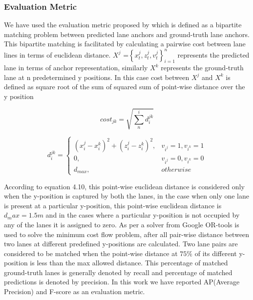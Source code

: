             \subsubsection{Evaluation Metric}
            
            We have used the evaluation metric proposed by \cite{guo2020gen} which is defined as a bipartite matching problem between predicted lane anchors and ground-truth lane anchors. This bipartite matching is facilitated by calculating a pairwise cost between lane lines in terms of euclidean distance. $X^{j}$ =$ \left\{x^{j}_{t},z^{j}_{t},v^{j}_{t}\right\}_{i=1}^{n}     $ represents the predicted lane in terms of anchor representation, similarly $X^{k}$ represents the ground-truth lane at n predetermined y positions. In this case cost between $X^{j}$ and $X^{k}$ is defined as square root of the sum of squared sum of point-wise distance over the y position
            
            \begin{equation}
             cost_{jk} = \sqrt{\sum_n^i d_{i}^{jk}}
            \end{equation}
            
            \begin{equation}
              d_{i}^{jk} = \begin{cases}(x_{i}^{j} - x_{i}^{k} )^{2} + (z_{i}^{j} - z_{i}^{k} )^{2},  & v_{i^{j}} =1, v_{i^{k}} =1 \\0,   & v_{i^{j}} =0, v_{i^{k}} =0\\ d_{max}, & otherwise\end{cases}
            \end{equation}
            
            According to equation 4.10, this point-wise euclidean distance is considered only when the y-position is captured by both the lanes, in the case when only one lane is present at a particular y-position, this point-wise euclidean distance is $d_max = 1.5m$ and in the cases where a particular y-position is not occupied by any of the lanes it is assigned to zero. As per \cite{guo2020gen} a solver from Google OR-tools is used to solve the minimum cost flow problem, after all pair-wise distance between two lanes at different predefined y-positions are calculated. Two lane pairs are considered to be matched when the point-wise distance at $75\%$ of its different y-position is less than the max allowed distance. This percentage of matched ground-truth lanes is generally denoted by recall and percentage of matched predictions is denoted by precision. In this work we have reported AP(Average Precision) and F-score as an evaluation metric. 
            
